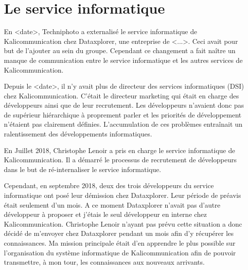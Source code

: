 
\section{Le service informatique}
En <date>, Techniphoto a externalisé le service informatique de Kalicommunication chez Dataxplorer, une entreprise de <...>. Ceci avait pour but de l'ajouter au sein du groupe. Cependant ce changement a fait naître un manque de communication entre le service informatique et les autres services de Kalicommunication.

Depuis le <date>, il n'y avait plus de directeur des services informatiques (DSI) chez Kalicommunication. C'était le directeur marketing qui était en charge des développeurs ainsi que de leur recrutement. Les développeurs n'avaient donc pas de supérieur hiérarchique à proprement parler et les priorités de développement n'étaient pas clairement définies. L'accumulation de ces problèmes entraînait un ralentissement des développements informatiques.

En Juillet 2018, Christophe Lenoir a pris en charge le service informatique de Kalicommunication. Il a démarré le processus de recrutement de développeurs dans le but de ré-internaliser le service informatique.

Cependant, en septembre 2018, deux des trois développeurs du service informatique ont posé leur démission chez Dataxplorer. Leur période de préavis était seulement d'un mois. A ce moment Dataxplorer n'avait pas d'autre développeur à proposer et j'étais le seul développeur en interne chez Kalicommunication. Christophe Lenoir n'ayant pas prévu cette situation a donc décidé de m'envoyer chez Dataxplorer pendant un mois afin d'y récupérer les connaissances.\newline
Ma mission principale était d'en apprendre le plus possible sur l'organisation du système informatique de Kalicommunication afin de pouvoir transmettre, à mon tour, les connaissances aux nouveaux arrivants.